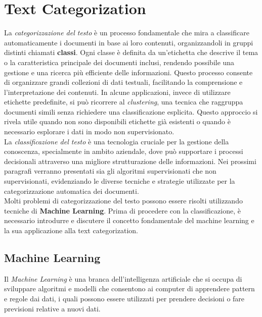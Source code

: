 \documentclass{report}
\begin{document}
	\chapter{Text Categorization}
	La \textit{categorizzazione del testo} è un processo fondamentale che mira a classificare automaticamente i documenti in base ai loro contenuti, organizzandoli in gruppi distinti chiamati \textbf{classi}. Ogni classe è definita da un’etichetta che descrive il tema o la caratteristica principale dei documenti inclusi, rendendo possibile una gestione e una ricerca più efficiente delle informazioni. Questo processo consente di organizzare grandi collezioni di dati testuali, facilitando la comprensione e l'interpretazione dei contenuti. In alcune applicazioni, invece di utilizzare etichette predefinite, si può ricorrere al \textit{clustering}, una tecnica che raggruppa documenti simili senza richiedere una classificazione esplicita. Questo approccio si rivela utile quando non sono disponibili etichette già esistenti o quando è necessario esplorare i dati in modo non supervisionato.
	\vspace{\baselineskip}\\
	La \textit{classificazione del testo} è una tecnologia cruciale per la gestione della conoscenza, specialmente in ambito aziendale, dove può supportare i processi decisionali attraverso una migliore strutturazione delle informazioni. Nei prossimi paragrafi verranno presentati sia gli algoritmi supervisionati che non supervisionati, evidenziando le diverse tecniche e strategie utilizzate per la categorizzazione automatica dei documenti.
	\vspace{\baselineskip}\\
	Molti problemi di categorizzazione del testo possono essere risolti utilizzando tecniche di \textbf{Machine Learning}. Prima di procedere con la classificazione, è necessario introdurre e discutere il concetto fondamentale del machine learning e la sua applicazione alla text categorization.

	\section{Machine Learning}
	Il \textit{Machine Learning} è una branca dell'intelligenza artificiale che si occupa di sviluppare algoritmi e modelli che consentono ai computer di apprendere pattern e regole dai dati, i quali possono essere utilizzati per prendere decisioni o fare previsioni relative a nuovi dati.
\end{document}
